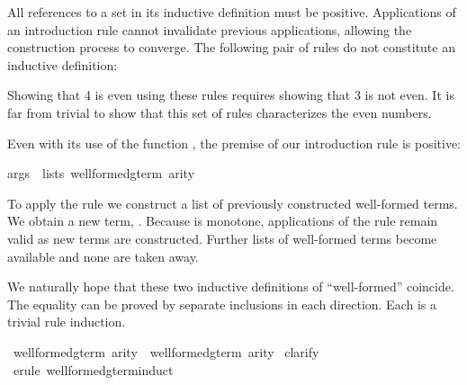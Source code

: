 \begin{isabellebody}
\begin{isamarkuptext}
\begin{isabelle}
\end{isabelle}
All references to a set in its
inductive definition must be positive.  Applications of an
introduction rule cannot invalidate previous applications, allowing the
construction process to converge.
The following pair of rules do not constitute an inductive definition:
\begin{trivlist}
\item {}
\item {}
\end{trivlist}
Showing that 4 is even using these rules requires showing that 3 is not
even.  It is far from trivial to show that this set of rules
characterizes the even numbers.  

Even with its use of the function , the premise of our
introduction rule is positive:
\begin{isabelle}%
args\ {\isasymin}\ lists\ {\isacharparenleft}well{\isacharunderscore}formed{\isacharunderscore}gterm{\isacharprime}\ arity{\isacharparenright}%
\end{isabelle}
To apply the rule we construct a list  of previously
constructed well-formed terms.  We obtain a
new term, .  Because  is monotone,
applications of the rule remain valid as new terms are constructed.
Further lists of well-formed
terms become available and none are taken away.%
%
\end{isamarkuptext}%
\isamarkuptrue%
%
\isamarkuptrue%
%
\begin{isamarkuptext}%
We naturally hope that these two inductive definitions of ``well-formed'' 
coincide.  The equality can be proved by separate inclusions in 
each direction.  Each is a trivial rule induction.%
\end{isamarkuptext}%
\isamarkuptrue%
\isamarkupfalse%
\ {\isachardoublequoteopen}well{\isacharunderscore}formed{\isacharunderscore}gterm\ arity\ {\isasymsubseteq}\ well{\isacharunderscore}formed{\isacharunderscore}gterm{\isacharprime}\ arity{\isachardoublequoteclose}\isanewline
%
\isadelimproof
%
\endisadelimproof
%
\isatagproof
{}\isamarkupfalse%
\ clarify\isanewline
{}\isamarkupfalse%
\ {\isacharparenleft}erule\ well{\isacharunderscore}formed{\isacharunderscore}gterm{\isachardot}induct{\isacharparenright}\isanewline
{}\isamarkupfalse%

\end{isabellebody}
